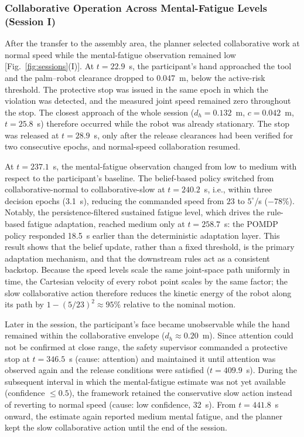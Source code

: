\subsubsection{Collaborative Operation Across Mental-Fatigue Levels (Session I)}
After the transfer to the assembly area, the planner selected collaborative work at normal speed while the
mental-fatigue observation remained low [Fig.~\ref{fig:sessions}(I)]. At $t = 22.9$~s, the participant's
hand approached the tool and the palm--robot clearance dropped to 0.047~m, below the active-risk threshold.
The protective stop was issued in the same epoch in which the violation was detected, and the measured
joint speed remained zero throughout the stop. The closest approach of the whole session ($d_h = 0.132$~m, $c = 0.042$~m, $t = 25.8$~s) therefore
occurred while the robot was already stationary. The stop was released at $t = 28.9$~s, only after the
release clearances had been verified for two consecutive epochs, and normal-speed collaboration resumed.

At $t = 237.1$~s, the mental-fatigue observation changed from low to medium with respect to the
participant's baseline. The belief-based policy switched from collaborative-normal to collaborative-slow
at $t = 240.2$~s, i.e., within three decision epochs (3.1~s), reducing the commanded speed from $23$ to
$5^\circ$/s ($-78\%$). Notably, the persistence-filtered sustained fatigue level, which drives the
rule-based fatigue adaptation, reached medium only at $t = 258.7$~s: the POMDP policy responded
18.5~s earlier than the deterministic adaptation layer. This result shows that the belief update, rather than
a fixed threshold, is the primary adaptation mechanism, and that the downstream rules act as a consistent
backstop. Because the speed levels scale the same joint-space path uniformly in time, the Cartesian
velocity of every robot point scales by the same factor; the slow collaborative action therefore reduces the
kinetic energy of the robot along its path by $1 - (5/23)^2 \approx 95\%$ relative to the nominal motion.

Later in the session, the participant's face became unobservable while the hand remained within the
collaborative envelope ($d_h \approx 0.20$~m). Since attention could not be confirmed at close range, the
safety supervisor commanded a protective stop at $t = 346.5$~s (cause: attention) and maintained it until
attention was observed again and the release conditions were satisfied ($t = 409.9$~s). During the
subsequent interval in which the mental-fatigue estimate was not yet available (confidence $\le 0.5$), the
framework retained the conservative slow action instead of reverting to normal speed (cause: low
confidence, 32~s). From $t = 441.8$~s onward, the estimate again reported medium mental fatigue, and the
planner kept the slow collaborative action until the end of the session.

